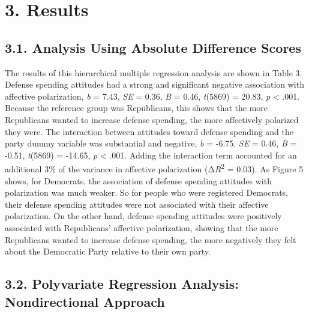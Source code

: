 \documentclass[authordate, meta]{jote-new-article}
\begin{document}
	\section{3. Results}



	\subsection{3.1. Analysis Using Absolute Difference Scores}



	The results of this hierarchical multiple regression analysis are shown in Table 3. Defense spending attitudes had a strong and significant negative association with affective polarization, \emph{b }= 7.43, \emph{SE }= 0.36, \emph{B }= 0.46, \emph{t}(5869) = 20.83, \emph{p }< .001. Because the reference group was Republicans, this shows that the more Republicans wanted to increase defense spending, the more affectively polarized they were.\emph{ }The interaction between attitudes toward defense spending and the party dummy variable was substantial and negative, \emph{b} = -6.75, \emph{SE} = 0.46, \emph{B} = -0.51, \emph{t}(5869) = -14.65, \emph{p} < .001. Adding the interaction term accounted for an additional 3\% of the variance in affective polarization (Δ\emph{R}\textsuperscript{2} = 0.03). As Figure 5 shows, for Democrats, the association of defense spending attitudes with polarization was much weaker. So for people who were registered Democrats, their defense spending attitudes were not associated with their affective polarization. On the other hand, defense spending attitudes were positively associated with Republicans' affective polarization, showing that the more Republicans wanted to increase defense spending, the more negatively they felt about the Democratic Party relative to their own party.



	\subsection{3.2. Polyvariate Regression Analysis: Nondirectional Approach}
\end{document}
